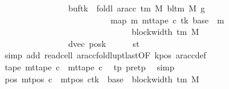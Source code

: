 \begin{isabellebody}
\ \ \ \ \ \ \ \ \ \ \ \ \ \ \ \ buf{\isacharparenleft}{\kern0pt}tk\ {\isacharcolon}{\kern0pt}{\isacharequal}{\kern0pt}\ foldl\ {\isacharparenleft}{\kern0pt}ar{\isacharunderscore}{\kern0pt}acc\ {\isacharparenleft}{\kern0pt}{\isasymGamma}{\isacharunderscore}{\kern0pt}tm\ M{\isacharparenright}{\kern0pt}\ {\isacharparenleft}{\kern0pt}bl{\isacharunderscore}{\kern0pt}tm\ M{\isacharparenright}{\kern0pt}{\isacharparenright}{\kern0pt}\ {\isacharquery}{\kern0pt}g{}\isanewline
\ \ \ \ \ \ \ \ \ \ \ \ \ \ \ \ \ \ \ \ \ \ \ \ \ \ {\isacharparenleft}{\kern0pt}map\ {\isacharparenleft}{\kern0pt}{\isasymlambda}m{\isachardot}{\kern0pt}\ mt{\isacharunderscore}{\kern0pt}tape\ c{\isacharprime}{\kern0pt}\ tk\ {\isacharparenleft}{\kern0pt}base\ {\isacharplus}{\kern0pt}\ m{\isacharparenright}{\kern0pt}{\isacharparenright}{\kern0pt}\isanewline
\ \ \ \ \ \ \ \ \ \ \ \ \ \ \ \ \ \ \ \ \ \ \ \ \ \ \ \ \ \ \ {\isacharbrackleft}{\kern0pt}{}{\isachardot}{\kern0pt}{\isachardot}{\kern0pt}{\isacharless}{\kern0pt}block{\isacharunderscore}{\kern0pt}width\ {\isacharparenleft}{\kern0pt}{\isasymGamma}{\isacharunderscore}{\kern0pt}tm\ M{\isacharparenright}{\kern0pt}{\isacharbrackright}{\kern0pt}{\isacharparenright}{\kern0pt}{\isacharparenright}{\kern0pt}{\isacharcomma}{\kern0pt}\isanewline
\ \ \ \ \ \ \ \ \ \ \ \ \ \ \ \ dvec{\isacharcomma}{\kern0pt}\ {\isacharquery}{\kern0pt}posk{\isacharprime}{\kern0pt}{\isacharparenright}{\kern0pt}{\isachardoublequoteclose}\isanewline
\ \ \ \ \isamarkupfalse%
\ st{}\ \isamarkupfalse%
\ {\isacharparenleft}{\kern0pt}simp\ add{\isacharcolon}{\kern0pt}\ read{\isacharunderscore}{\kern0pt}cell{}\ ar{\isacharunderscore}{\kern0pt}acc{\isacharunderscore}{\kern0pt}foldl{\isacharunderscore}{\kern0pt}upt{\isacharunderscore}{\kern0pt}last{\isacharbrackleft}{\kern0pt}OF\ kpos{\isacharbrackright}{\kern0pt}\ ar{\isacharunderscore}{\kern0pt}acc{\isacharunderscore}{\kern0pt}def{\isacharparenright}{\kern0pt}\isanewline
\ \ \isamarkupfalse%
\ tape{}{\isacharcolon}{\kern0pt}\ {\isachardoublequoteopen}mt{\isacharunderscore}{\kern0pt}tape\ c{}\ {\isacharequal}{\kern0pt}\ mt{\isacharunderscore}{\kern0pt}tape\ c{\isacharprime}{\kern0pt}{\isachardoublequoteclose}\ \isamarkupfalse%
\ tp{}\ pre{\isacharunderscore}{\kern0pt}tp\ \isamarkupfalse%
\ simp\isanewline
\ \ \isamarkupfalse%
\ pos{}{\isacharcolon}{\kern0pt}\ {\isachardoublequoteopen}mt{\isacharunderscore}{\kern0pt}pos\ c{}\ {\isacharequal}{\kern0pt}\ {\isacharparenleft}{\kern0pt}mt{\isacharunderscore}{\kern0pt}pos\ c{\isacharprime}{\kern0pt}{\isacharparenright}{\kern0pt}{\isacharparenleft}{\kern0pt}tk\ {\isacharcolon}{\kern0pt}{\isacharequal}{\kern0pt}\ base\ {\isacharplus}{\kern0pt}\ block{\isacharunderscore}{\kern0pt}width\ {\isacharparenleft}{\kern0pt}{\isasymGamma}{\isacharunderscore}{\kern0pt}tm\ M{\isacharparenright}{\kern0pt}{\isacharparenright}{\kern0pt}{\isachardoublequoteclose}\isanewline

\end{isabellebody}
